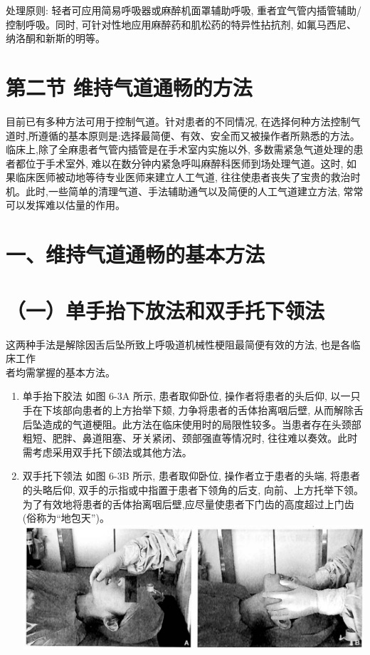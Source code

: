 \documentclass[10pt]{article}
\begin{document}
处理原则: 轻者可应用简易呼吸器或麻醉机面罩辅助呼吸, 重者宜气管内插管辅助/控制呼吸。同时, 可针对性地应用麻醉药和肌松药的特异性拈抗剂, 如氟马西尼、纳洛酮和新斯的明等。

\section*{第二节 维持气道通畅的方法}
目前已有多种方法可用于控制气道。针对患者的不同情况, 在选择何种方法控制气道时,所遵循的基本原则是:选择最简便、有效、安全而又被操作者所熟悉的方法。临床上,除了全麻患者气管内插管是在手术室内实施以外, 多数需紧急气道处理的患者都位于手术室外, 难以在数分钟内紧急呼叫麻醉科医师到场处理气道。这时, 如果临床医师被动地等待专业医师来建立人工气道, 往往使患者丧失了宝贵的救治时机。此时,一些简单的清理气道、手法辅助通气以及简便的人工气道建立方法, 常常可以发挥难以估量的作用。

\section*{一、维持气道通畅的基本方法}
\section*{（一）单手抬下放法和双手托下领法}
这两种手法是解除因舌后坠所致上呼吸道机械性梗阻最简便有效的方法, 也是各临床工作\\
者均需掌握的基本方法。

\begin{enumerate}
  \item 单手抬下㬵法 如图 6-3A 所示, 患者取仰卧位, 操作者将患者的头后仰, 以一只手在下垓部向患者的上方抬举下颏, 力争将患者的舌体抬离咽后壁, 从而解除舌后坠造成的气道梗阻。此方法在临床使用时的局限性较多。当患者存在头颈部粗短、肥胖、鼻道阻塞、牙关紧闭、颈部强直等情况时, 往往难以奏效。此时需考虑采用双手托下颌法或其他方法。

  \item 双手托下领法 如图 6-3B 所示, 患者取仰卧位, 操作者立于患者的头端, 将患者的头略后仰, 双手的示指或中指置于患者下领角的后支, 向前、上方托举下领。为了有效地将患者的舌体抬离咽后壁,应尽量使患者下门齿的高度超过上门齿(俗称为“地包天”)。\\
\includegraphics[max width=\textwidth, center]{2024_07_09_002a177993bd97d1d6d7g-086(1)}

\end{enumerate}
\end{document}
